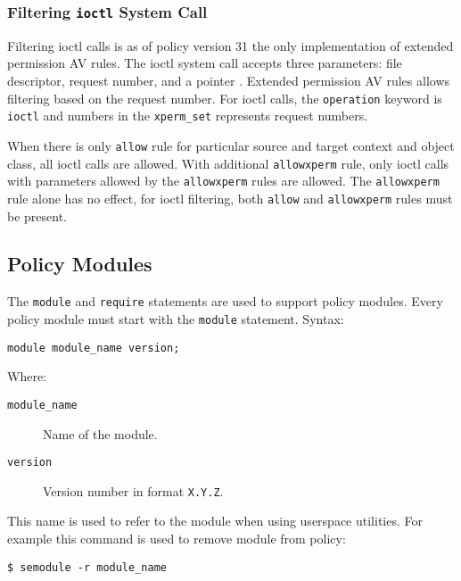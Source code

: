 \subsubsection{Filtering \texttt{ioctl} System Call}
Filtering ioctl calls is as of policy version 31 the only implementation of
extended permission AV rules. The ioctl system call accepts three parameters:
file descriptor, request number, and a pointer \cite{ioctl}. Extended permission
AV rules allows filtering based on the request number. For ioctl calls, the
\texttt{operation} keyword is \texttt{ioctl} and numbers in the
\texttt{xperm\_set} represents request numbers.

When there is only \texttt{allow} rule for particular source and target context
and object class, all ioctl calls are allowed. With additional
\texttt{allowxperm} rule, only ioctl calls with parameters allowed by the
\texttt{allowxperm} rules are allowed. The \texttt{allowxperm} rule alone has
no effect, for ioctl filtering, both \texttt{allow} and \texttt{allowxperm}
rules must be present.

\subsection{Policy Modules}
\label{modules}

The \texttt{module} and \texttt{require} statements are used to support policy
modules. Every policy module must start with the \texttt{module} statement.
Syntax:
\begin{lstlisting}[language=te]
module module_name version;
\end{lstlisting}
Where:
\begin{description}
    \item [\texttt{module\_name}] Name of the module.
    \item [\texttt{version}] Version number in format \texttt{X.Y.Z}.
\end{description}
This name is used to refer to the module when using userspace utilities. For
example this command is used to remove module from policy:
\begin{lstlisting}
$ semodule -r module_name
\end{lstlisting}

